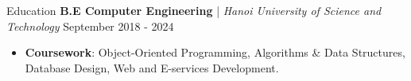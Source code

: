 \begin{rSection}{Education}
    \textbf{B.E Computer Engineering} | \textit{ Hanoi University of Science and Technology } \hfill {September 2018 - 2024}
    \begin{itemize}
        \itemsep 0pt {} \vspace{0.5em}
        \item \textbf{Coursework}: Object-Oriented Programming, Algorithms \& Data Structures, Database Design, Web and E-services Development.
    \end{itemize}
\end{rSection}